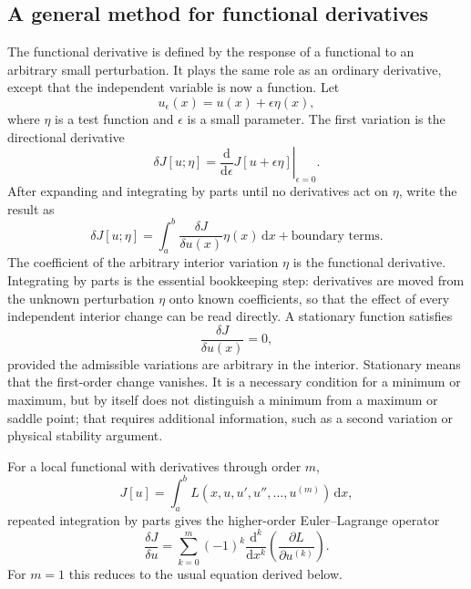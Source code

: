 \subsection{A general method for functional derivatives}
The functional derivative is defined by the response of a functional to an arbitrary small perturbation. It plays the same role as an ordinary derivative, except that the independent variable is now a function. Let
\begin{equation}
u_\epsilon(x)=u(x)+\epsilon\eta(x),
\end{equation}
where $\eta$ is a test function and $\epsilon$ is a small parameter. The first variation is the directional derivative
\begin{equation}
\delta J[u;\eta]
=\left.\frac{\mathrm{d}}{\mathrm{d}\epsilon}J[u+\epsilon\eta]\right|_{\epsilon=0}.
\end{equation}
After expanding and integrating by parts until no derivatives act on $\eta$, write the result as
\begin{equation}
\delta J[u;\eta]
=\int_a^b\frac{\delta J}{\delta u(x)}\eta(x)\,\mathrm{d}x
+\text{boundary terms}.
\end{equation}
The coefficient of the arbitrary interior variation $\eta$ is the functional derivative. Integrating by parts is the essential bookkeeping step: derivatives are moved from the unknown perturbation $\eta$ onto known coefficients, so that the effect of every independent interior change can be read directly. A stationary function satisfies
\begin{equation}
\frac{\delta J}{\delta u(x)}=0,
\end{equation}
provided the admissible variations are arbitrary in the interior. Stationary means that the first-order change vanishes. It is a necessary condition for a minimum or maximum, but by itself does not distinguish a minimum from a maximum or saddle point; that requires additional information, such as a second variation or physical stability argument.

For a local functional with derivatives through order $m$,
\begin{equation}
J[u]=\int_a^bL(x,u,u',u'',\ldots,u^{(m)})\,\mathrm{d}x,
\end{equation}
repeated integration by parts gives the higher-order Euler--Lagrange operator
\begin{equation}
\frac{\delta J}{\delta u}
=\sum_{k=0}^{m}(-1)^k\frac{\mathrm{d}^k}{\mathrm{d}x^k}
\left(\frac{\partial L}{\partial u^{(k)}}\right).
\end{equation}
For $m=1$ this reduces to the usual equation derived below.

